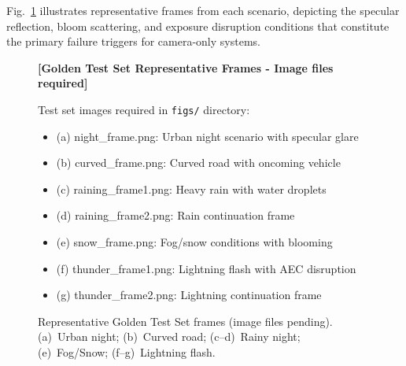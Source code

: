 \documentclass{jstarticle}
\theoremstyle{remark}
\begin{document}
\begin{table}[H]
\centering
\caption{Golden Test Set scenario composition and environmental
         challenges}
\label{tab:testset}
\end{table}

Fig.~\ref{fig:testset} illustrates representative frames from each
scenario, depicting the specular reflection, bloom scattering, and
exposure disruption conditions that constitute the primary failure
triggers for camera-only systems.

\begin{figure}[H]
\centering

\small\textbf{[Golden Test Set Representative Frames - Image files required]}

\medskip
Test set images required in \texttt{figs/} directory:
\begin{itemize}[leftmargin=*,label=--]
  \item (a) night\_frame.png: Urban night scenario with specular glare
  \item (b) curved\_frame.png: Curved road with oncoming vehicle
  \item (c) raining\_frame1.png: Heavy rain with water droplets
  \item (d) raining\_frame2.png: Rain continuation frame
  \item (e) snow\_frame.png: Fog/snow conditions with blooming
  \item (f) thunder\_frame1.png: Lightning flash with AEC disruption
  \item (g) thunder\_frame2.png: Lightning continuation frame
\end{itemize}

\caption{Representative Golden Test Set frames (image files pending).
(a)~Urban night; (b)~Curved road; (c--d)~Rainy night;
(e)~Fog/Snow; (f--g)~Lightning flash.}
\label{fig:testset}
\end{figure}
\end{document}
